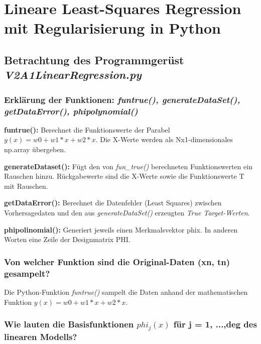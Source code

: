 \section{Lineare Least-Squares Regression mit Regularisierung in Python}


\subsection{
    Betrachtung des Programmgerüst \textit{V2A1\textunderscore LinearRegression.py}
}

\subsubsection{Erklärung der Funktionen: \textit{fun\textunderscore true(), generateDataSet(), getDataError(), phi\textunderscore polynomial()}}

\textbf{fun\textunderscore true():} Berechnet die Funktionswerte der Parabel
$y(x) = w0 + w1*x + w2*x$. Die X-Werte werden als Nx1-dimensionales np.array übergeben.

\noindent
\vspace{5px}
\textbf{generateDataset():} Fügt den von \textit{fun_true()} berechneten Funktionswerten ein Rauschen hinzu. Rückgabewerte sind die X-Werte sowie die Funktionswerte T mit Rauschen.

\noindent
\vspace{5px}
\textbf{getDataError():} Berechnet die Datenfehler (Least Squares) zwischen Vorhersagedaten und den aus \textit{generateDataSet()} erzeugten \textit{True Target-Werten}.

\noindent
\vspace{5px}
\textbf{phi\textunderscore polinomial():} Generiert jeweils einen Merkmalsvektor phi\textunderscore x. In anderen Worten eine Zeile der Designmatrix PHI.

\subsubsection{Von welcher Funktion sind die Original-Daten (xn, tn) gesampelt?}

Die Python-Funktion \textit{fun\textunderscore true()} sampelt die Daten anhand der mathematischen Funktion $y(x) = w0 + w1*x + w2*x$.

\subsubsection{Wie lauten die Basisfunktionen $phi_j(x)$ für j = 1, ...,deg des linearen Modells?}

